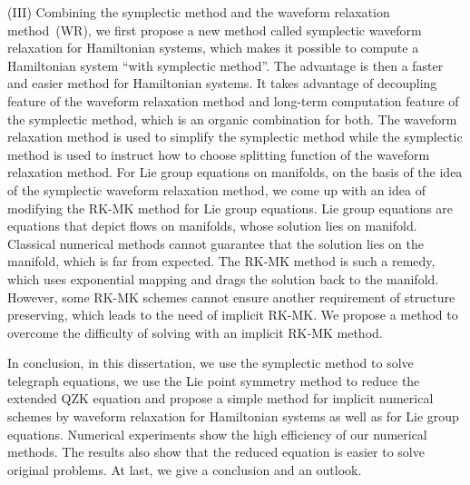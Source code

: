 {(III) Combining the symplectic method and the waveform relaxation method~(WR), we first propose a new method called
symplectic waveform relaxation for Hamiltonian systems, which makes it possible to compute a Hamiltonian system
``with symplectic method''. The advantage is then a faster and easier method for Hamiltonian systems. It takes
advantage of decoupling feature of the waveform relaxation method and long-term computation
feature of the symplectic method, which is an organic combination for both. The waveform relaxation method is used to
simplify the symplectic method while the symplectic method is used to instruct how to choose splitting function of the waveform
relaxation method. For Lie group equations on manifolds, on the basis of
the idea of the symplectic waveform relaxation method, we come up with an idea of modifying the RK-MK method
for Lie group equations. Lie group equations are equations that depict flows on manifolds, whose solution lies on manifold.
Classical numerical methods cannot guarantee that the solution lies on the manifold, which is far from expected.
The RK-MK method is such a remedy, which uses exponential mapping and drags the solution back to
the manifold. However, some RK-MK schemes cannot ensure another requirement of structure preserving,
which leads to the need of implicit RK-MK. We propose a method to overcome the difficulty of solving with an implicit RK-MK method.

In conclusion, in this dissertation, we use the symplectic method to solve telegraph equations, we use the Lie point symmetry method
to reduce the extended QZK equation and propose a simple method for implicit numerical schemes by waveform relaxation for
Hamiltonian systems as well as for Lie group equations. Numerical experiments show the high efficiency of
our numerical methods. The results also show that the reduced equation is easier to solve original problems. At last, we give a conclusion
and an outlook.

}

